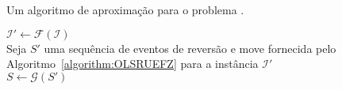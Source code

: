 \begin{algorithm}[!tbh]
  \caption{Um algoritmo de aproximação para o problema \SbIRM{}.\label{algorithm:VRXYTMUD}}
  $\mathcal{I'} \gets \mathcal{F}(\mathcal{I})$ \\
  Seja $S'$ uma sequência de eventos de reversão e move fornecida pelo Algoritmo~\ref{algorithm:OLSRUEFZ} para a instância $\mathcal{I'}$ \\
  $S\gets \mathcal{G}(S')$ \\
\end{algorithm}